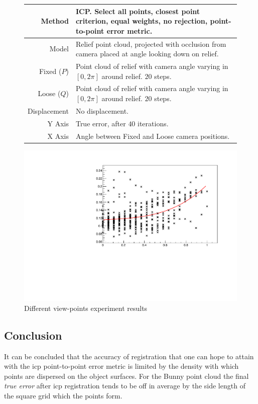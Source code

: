 \begin{figure}[H]
\begin{tabularx}{\textwidth}{|r|X|} \hline
Method & ICP. Select all points, closest point criterion, equal weights, no rejection, point-to-point error metric. \\ \hline
Model & Relief point cloud, projected with occlusion from camera placed at angle looking down on relief. \\ \hline
Fixed ($P$) & Point cloud of relief with camera angle varying in $[0, 2 \pi]$ around relief. $20$ steps. \\ \hline
Loose ($Q$) & Point cloud of relief with camera angle varying in $[0, 2 \pi]$ around relief. $20$ steps. \\ \hline
Displacement & No displacement. \\ \hline
Y Axis & True error, after $40$ iterations. \\\hline
X Axis & Angle between Fixed and Loose camera positions. \\ \hline
\end{tabularx}
\end{figure}
\begin{figure}[H]
\centering
\includegraphics[width=.7\textwidth]{fig/relief_dproj.pdf}
\caption{Different view-points experiment results}
\end{figure}


\subsection{Conclusion}
It can be concluded that the accuracy of registration that one can hope to attain with the \gls{icp} point-to-point error metric is limited by the density with which points are dispersed on the object surfaces. For the Bunny point cloud the final \emph{true error} after \gls{icp} registration tends to be off in average by the side length of the square grid which the points form.

